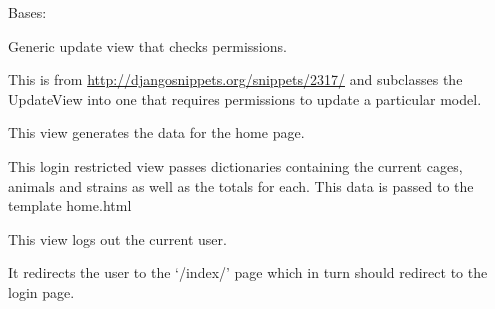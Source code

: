 \documentclass[letterpaper,10pt,english]{sphinxmanual}
\begin{document}

\begin{fulllineitems}
\label{api:mousedb.views.RestrictedUpdateView}
Bases: \href{http://docs.djangoproject.com/en/dev/ref/class-based-views/\#django.views.generic.edit.UpdateView}{}

Generic update view that checks permissions.

This is from \href{http://djangosnippets.org/snippets/2317/}{http://djangosnippets.org/snippets/2317/} and subclasses the UpdateView into one that requires permissions to update a particular model.

\begin{fulllineitems}
\label{api:mousedb.views.RestrictedUpdateView.dispatch}
\end{fulllineitems}


\end{fulllineitems}


\begin{fulllineitems}
\label{api:mousedb.views.home}
This view generates the data for the home page.

This login restricted view passes dictionaries containing the current cages, animals and strains as well as the totals for each.  This data is passed to the template home.html

\end{fulllineitems}


\begin{fulllineitems}
\label{api:mousedb.views.logout_view}
This view logs out the current user.

It redirects the user to the `/index/' page which in turn should redirect to the login page.

\end{fulllineitems}
\end{document}
